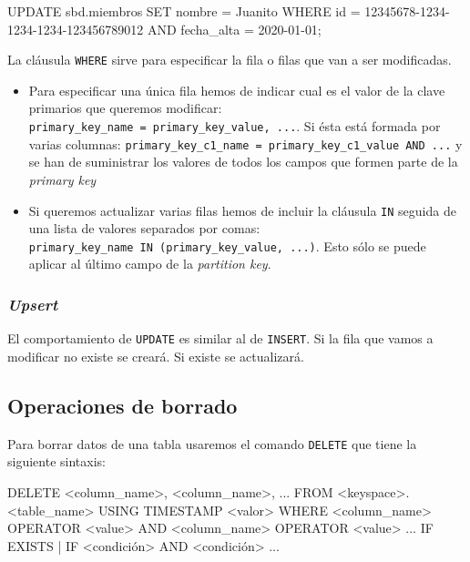 \documentclass[
]{book}
\newenvironment{Shaded}{}{}
\newcommand{\NormalTok}[1]{#1}
\providecommand{\tightlist}{%
  \setlength{\itemsep}{0pt}\setlength{\parskip}{0pt}}
\begin{document}
\begin{Shaded}
\begin{Highlighting}[]
\NormalTok{UPDATE sbd.miembros}
\NormalTok{SET nombre = \textquotesingle{}Juanito\textquotesingle{}}
\NormalTok{WHERE id = 12345678{-}1234{-}1234{-}1234{-}123456789012 AND fecha\_alta = \textquotesingle{}2020{-}01{-}01\textquotesingle{};}
\end{Highlighting}
\end{Shaded}

La cláusula \texttt{WHERE} sirve para especificar la fila o filas que van a ser modificadas.

\begin{itemize}
\tightlist
\item
  Para especificar una única fila hemos de indicar cual es el valor de la clave primarios que queremos modificar: \texttt{primary\_key\_name\ =\ primary\_key\_value,\ ...}. Si ésta está formada por varias columnas: \texttt{primary\_key\_c1\_name\ =\ primary\_key\_c1\_value\ AND\ ...} y se han de suministrar los valores de todos los campos que formen parte de la \emph{primary key}
\item
  Si queremos actualizar varias filas hemos de incluir la cláusula \texttt{IN} seguida de una lista de valores separados por comas: \texttt{primary\_key\_name\ IN\ (primary\_key\_value,\ ...)}. Esto sólo se puede aplicar al último campo de la \emph{partition key}.
\end{itemize}

\subsubsection{\texorpdfstring{\emph{Upsert}}{Upsert}}\label{upsert}

El comportamiento de \texttt{UPDATE} es similar al de \texttt{INSERT}. Si la fila que vamos a modificar no existe se creará. Si existe se actualizará.

\subsection{Operaciones de borrado}\label{operaciones-de-borrado}

Para borrar datos de una tabla usaremos el comando \texttt{DELETE} que tiene la siguiente sintaxis:

\begin{Shaded}
\begin{Highlighting}[]
\NormalTok{DELETE \textless{}column\_name\textgreater{}, \textless{}column\_name\textgreater{}, ...}
\NormalTok{FROM \textless{}keyspace\textgreater{}.\textless{}table\_name\textgreater{}}
\NormalTok{USING TIMESTAMP \textless{}valor\textgreater{}}
\NormalTok{WHERE \textless{}column\_name\textgreater{} OPERATOR \textless{}value\textgreater{}}
\NormalTok{  AND \textless{}column\_name\textgreater{} OPERATOR \textless{}value\textgreater{}}
\NormalTok{  ...}
\NormalTok{IF EXISTS | IF \textless{}condición\textgreater{}}
\NormalTok{  AND \textless{}condición\textgreater{}}
\NormalTok{  ...}
\end{Highlighting}
\end{Shaded}
\end{document}
